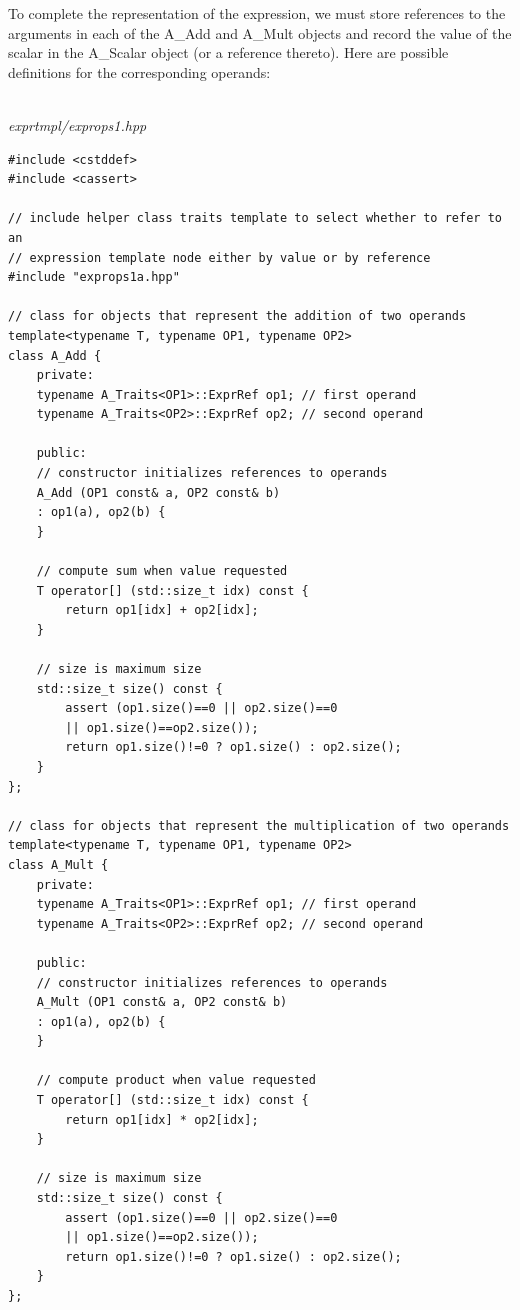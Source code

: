 
To complete the representation of the expression, we must store references to the arguments in each of the A\_Add and A\_Mult objects and record the value of the scalar in the A\_Scalar object (or a reference thereto). Here are possible definitions for the corresponding operands:

\hspace*{\fill} \\ %
\noindent
\textit{exprtmpl/exprops1.hpp}
\begin{lstlisting}[style=styleCXX]
#include <cstddef>
#include <cassert>

// include helper class traits template to select whether to refer to an
// expression template node either by value or by reference
#include "exprops1a.hpp"

// class for objects that represent the addition of two operands
template<typename T, typename OP1, typename OP2>
class A_Add {
	private:
	typename A_Traits<OP1>::ExprRef op1; // first operand
	typename A_Traits<OP2>::ExprRef op2; // second operand
	
	public:
	// constructor initializes references to operands
	A_Add (OP1 const& a, OP2 const& b)
	: op1(a), op2(b) {
	}

	// compute sum when value requested
	T operator[] (std::size_t idx) const {
		return op1[idx] + op2[idx];
	}

	// size is maximum size
	std::size_t size() const {
		assert (op1.size()==0 || op2.size()==0
		|| op1.size()==op2.size());
		return op1.size()!=0 ? op1.size() : op2.size();
	}
};

// class for objects that represent the multiplication of two operands
template<typename T, typename OP1, typename OP2>
class A_Mult {
	private:
	typename A_Traits<OP1>::ExprRef op1; // first operand
	typename A_Traits<OP2>::ExprRef op2; // second operand
	
	public:
	// constructor initializes references to operands
	A_Mult (OP1 const& a, OP2 const& b)
	: op1(a), op2(b) {
	}

	// compute product when value requested
	T operator[] (std::size_t idx) const {
		return op1[idx] * op2[idx];
	}

	// size is maximum size
	std::size_t size() const {
		assert (op1.size()==0 || op2.size()==0
		|| op1.size()==op2.size());
		return op1.size()!=0 ? op1.size() : op2.size();
	}
};
\end{lstlisting}

